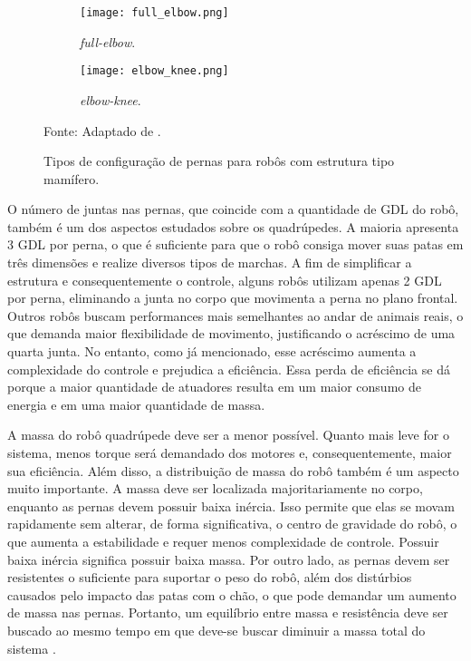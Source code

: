 \documentclass[conference]{IEEEtran}
\begin{document}
\begin{figure}[htbp]
  \centering
  \begin{subfigure}[htbp]{0.24\textwidth}
    \centering
    \texttt{[image: full\_elbow.png]}
    \caption{\textit{full-elbow}.}
    \label{fig:joint_configurations_a}
  \end{subfigure}
  \begin{subfigure}[htbp]{0.24\textwidth}
      \centering
      \texttt{[image: elbow\_knee.png]}
      \caption{\textit{elbow-knee}.}
      \label{fig:joint_configurations_d}
  \end{subfigure}

  \caption{Tipos de configuração de pernas para robôs com estrutura tipo mamífero.}
  Fonte: Adaptado de \cite{Yao2021}.
  \label{fig:joint_configurations}
\end{figure}

O número de juntas nas pernas, que coincide com a quantidade de GDL do robô, também é um dos aspectos estudados sobre os quadrúpedes. A maioria apresenta 3 GDL por perna, o que é suficiente para que o robô consiga mover suas patas em três dimensões e realize diversos tipos de marchas. A fim de simplificar a estrutura e consequentemente o controle, alguns robôs utilizam apenas 2 GDL por perna, eliminando a junta no corpo que movimenta a perna no plano frontal. Outros robôs buscam performances mais semelhantes ao andar de animais reais, o que demanda maior flexibilidade de movimento, justificando o acréscimo de uma quarta junta. No entanto, como já mencionado, esse acréscimo aumenta a complexidade do controle e prejudica a eficiência. Essa perda de eficiência se dá porque a maior quantidade de atuadores resulta em um maior consumo de energia e em uma maior quantidade de massa.

A massa do robô quadrúpede deve ser a menor possível. Quanto mais leve for o sistema, menos torque será demandado dos motores e, consequentemente, maior sua eficiência. Além disso, a distribuição de massa do robô também é um aspecto muito importante. A massa deve ser localizada majoritariamente no corpo, enquanto as pernas devem possuir baixa inércia. Isso permite que elas se movam rapidamente sem alterar, de forma significativa, o centro de gravidade do robô, o que aumenta a estabilidade e requer menos complexidade de controle. Possuir baixa inércia significa possuir baixa massa. Por outro lado, as pernas devem ser resistentes o suficiente para suportar o peso do robô, além dos distúrbios causados pelo impacto das patas com o chão, o que pode demandar um aumento de massa nas pernas. Portanto, um equilíbrio entre massa e resistência deve ser buscado ao mesmo tempo em que deve-se buscar diminuir a massa total do sistema \cite{Zhong2019}.
\end{document}
